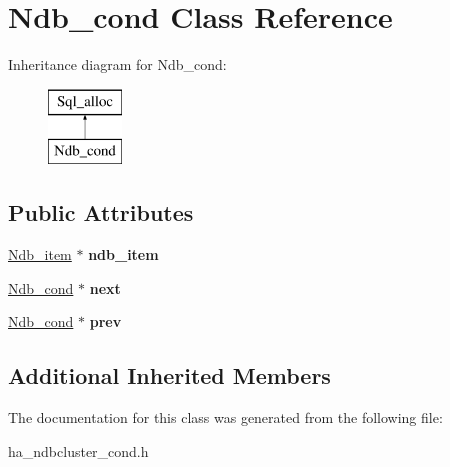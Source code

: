 \hypertarget{classNdb__cond}{}\section{Ndb\+\_\+cond Class Reference}
\label{classNdb__cond}
Inheritance diagram for Ndb\+\_\+cond\+:\begin{figure}[H]
\begin{center}
\leavevmode
\includegraphics[height=2.000000cm]{classNdb__cond}
\end{center}
\end{figure}
\subsection*{Public Attributes}
\begin{DoxyCompactItemize}
\item 
\mbox{\label{classNdb__cond_aed4fdda896a40dff87f4e3c9da7ea4bb}} 
\mbox{\hyperlink{classNdb__item}{Ndb\+\_\+item}} $\ast$ {\bfseries ndb\+\_\+item}
\item 
\mbox{\label{classNdb__cond_a1cc30acc99647027a26ffbfafc81f4ba}} 
\mbox{\hyperlink{classNdb__cond}{Ndb\+\_\+cond}} $\ast$ {\bfseries next}
\item 
\mbox{\label{classNdb__cond_a94409576577d37b8ab18414bf14b987a}} 
\mbox{\hyperlink{classNdb__cond}{Ndb\+\_\+cond}} $\ast$ {\bfseries prev}
\end{DoxyCompactItemize}
\subsection*{Additional Inherited Members}


The documentation for this class was generated from the following file\+:\begin{DoxyCompactItemize}
\item 
ha\+\_\+ndbcluster\+\_\+cond.\+h\end{DoxyCompactItemize}
